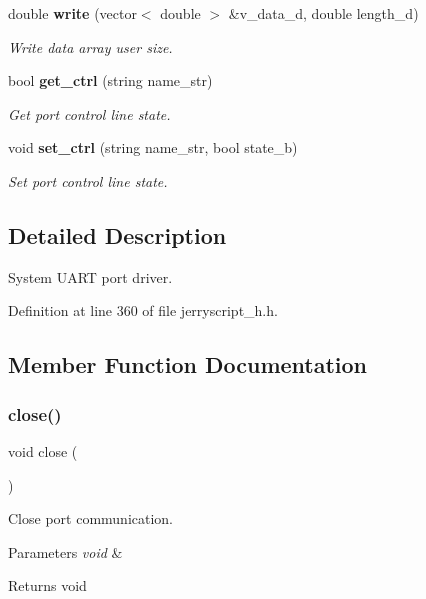 \begin{DoxyCompactItemize}
double \textbf{ write} (vector$<$ double $>$ \&v\+\_\+data\+\_\+d, double length\+\_\+d)
\begin{DoxyCompactList}\small\item\em Write data array user size. \end{DoxyCompactList}\item 
bool \textbf{ get\+\_\+ctrl} (string name\+\_\+str)
\begin{DoxyCompactList}\small\item\em Get port control line state. \end{DoxyCompactList}\item 
void \textbf{ set\+\_\+ctrl} (string name\+\_\+str, bool state\+\_\+b)
\begin{DoxyCompactList}\small\item\em Set port control line state. \end{DoxyCompactList}\end{DoxyCompactItemize}


\subsection{Detailed Description}
System U\+A\+RT port driver. 

Definition at line 360 of file jerryscript\+\_\+h.\+h.



\subsection{Member Function Documentation}
\mbox{\label{classuart_a67b72387b99fb35706b11eeba7070bc4}} 
\subsubsection{close()}
{\footnotesize\ttfamily void close (\begin{DoxyParamCaption}\item[{void}]{ }\end{DoxyParamCaption})}



Close port communication. 


\begin{DoxyCode}{0}
\end{DoxyCode}



\begin{DoxyParams}{Parameters}
{\em void} & \\
\hline
\end{DoxyParams}
\begin{DoxyReturn}{Returns}
void 
\end{DoxyReturn}
\mbox{\label{classuart_a84cca1155f5d878543d5fe04da7e9154}} 
